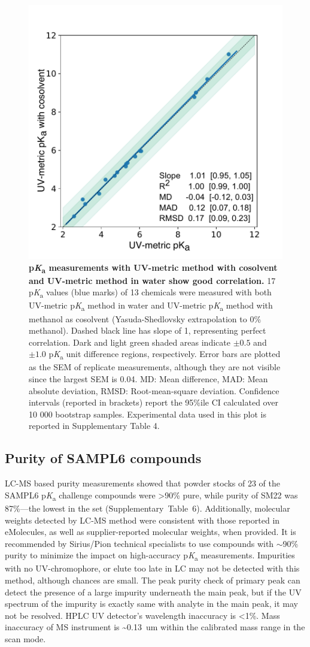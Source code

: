 \documentclass[9pt,lineno]{elife}
\newcommand{\pKa}{p\textit{K}\textsubscript{a}}
\begin{document}
\begin{figure}
\begin{center}
\includegraphics[width=0.5\linewidth]{figures/water_vs_cosolvent_pKa_values_correlation_plot.pdf}
\caption{{\bf \pKa{} measurements with UV-metric method with cosolvent and UV-metric method in water show good correlation.} 
17 \pKa{} values (blue marks) of 13 chemicals were measured with both UV-metric \pKa{} method in water and UV-metric \pKa{} method with methanol as cosolvent (Yasuda-Shedlovsky extrapolation to 0\% methanol). Dashed black line has slope of 1, representing perfect correlation.  Dark and light green shaded areas indicate $\pm 0.5$ and $\pm 1.0$ \pKa{} unit difference regions, respectively. 
Error bars are plotted as the SEM of replicate measurements, although they are not visible since the largest SEM is 0.04. 
MD: Mean difference, MAD: Mean absolute deviation, RMSD: Root-mean-square deviation.  
Confidence intervals (reported in brackets) report the 95\%ile CI calculated over 10 000 bootstrap samples. Experimental data used in this plot is reported in Supplementary Table 4. 
}
\label{fig:water_vs_cosolvent_pKa_correlation}
\end{center}
\end{figure}

\subsection{Purity of SAMPL6 compounds}
LC-MS based purity measurements showed that powder stocks of 23 of the SAMPL6 \pKa{} challenge compounds were >90\% pure, while purity of SM22 was 87\%---the lowest in the set (Supplementary~Table~6).  
Additionally, molecular weights detected by LC-MS method were consistent with those reported in eMolecules, as well as supplier-reported molecular weights, when provided. 
It is recommended by Sirius/Pion technical specialists to use compounds with $\sim$90\% purity to minimize the impact on high-accuracy \pKa{} measurements. 
Impurities with no UV-chromophore, or elute too late in LC may not be detected with this method, although chances are small. 
The peak purity check of primary peak can detect the presence of a large impurity underneath the main peak, but if the UV spectrum of the impurity is exactly same with analyte in the main peak, it may not be resolved. HPLC UV detector's wavelength inaccuracy is <1\%. 
Mass inaccuracy of MS instrument is \textasciitilde0.13~um within the calibrated mass range in the scan mode. 
\end{document}
